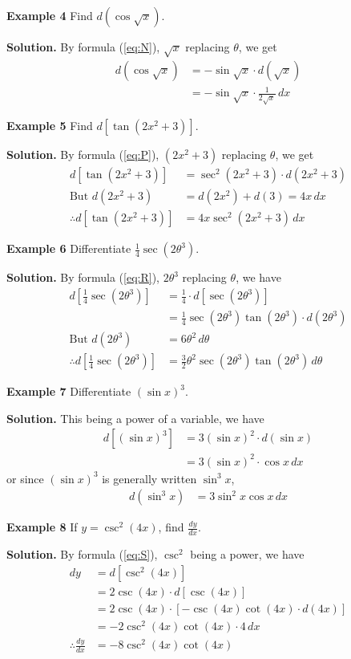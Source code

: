 \textbf{Example 4}
Find $d(\cos\sqrt{x})$.

\noindent\textbf{Solution.} By formula (\eqref{eq:N}), $\sqrt{x}$ replacing $\theta$, we get
\begin{align*}
d(\cos\sqrt{x}) &= -\sin\sqrt{x}\cdot d(\sqrt{x}) \\
&= -\sin\sqrt{x}\cdot \frac{1}{2\sqrt{x}}\,dx
\end{align*}

\textbf{Example 5}
Find $d[\tan(2x^2+3)]$.

\noindent\textbf{Solution.} By formula (\eqref{eq:P}), $(2x^2+3)$ replacing $\theta$, we get
\begin{align*}
d[\tan(2x^2+3)] &= \sec^2(2x^2+3)\cdot d(2x^2+3) \\
\text{But } d(2x^2+3) &= d(2x^2) + d(3) = 4x\,dx \\
\therefore d[\tan(2x^2+3)] &= 4x\sec^2(2x^2+3)\,dx
\end{align*}

\textbf{Example 6}
Differentiate $\frac{1}{4}\sec(2\theta^3)$.

\noindent\textbf{Solution.} By formula (\eqref{eq:R}), $2\theta^3$ replacing $\theta$, we have
\begin{align*}
d[\frac{1}{4}\sec(2\theta^3)] &= \frac{1}{4}\cdot d[\sec(2\theta^3)] \\
&= \frac{1}{4}\sec(2\theta^3)\tan(2\theta^3)\cdot d(2\theta^3) \\
\text{But } d(2\theta^3) &= 6\theta^2\,d\theta \\
\therefore d[\frac{1}{4}\sec(2\theta^3)] &= \frac{3}{2}\theta^2\sec(2\theta^3)\tan(2\theta^3)\,d\theta
\end{align*}

\textbf{Example 7}
Differentiate $(\sin x)^3$.

\noindent\textbf{Solution.} This being a power of a variable, we have
\begin{align*}
d[(\sin x)^3] &= 3(\sin x)^2\cdot d(\sin x) \\
&= 3(\sin x)^2\cdot \cos x\,dx
\end{align*}
or since $(\sin x)^3$ is generally written $\sin^3 x$,
\begin{align*}
d(\sin^3 x) &= 3\sin^2 x\cos x\,dx
\end{align*}

\textbf{Example 8}
If $y = \csc^2(4x)$, find $\frac{dy}{dx}$.

\noindent\textbf{Solution.} By formula (\eqref{eq:S}), $\csc^2$ being a power, we have
\begin{align*}
dy &= d[\csc^2(4x)] \\
&= 2\csc(4x)\cdot d[\csc(4x)] \\
&= 2\csc(4x)\cdot [-\csc(4x)\cot(4x)\cdot d(4x)] \\
&= -2\csc^2(4x)\cot(4x)\cdot 4\,dx \\
\therefore \frac{dy}{dx} &= -8\csc^2(4x)\cot(4x)
\end{align*}

